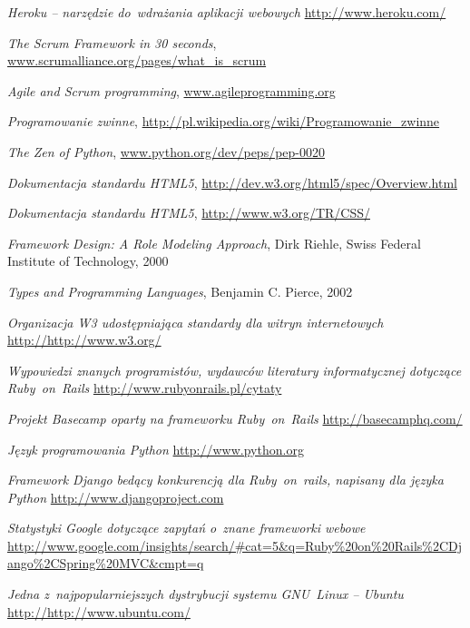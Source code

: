 \begin{thebibliography}{99}
   \emph{Heroku -- narzędzie do~wdrażania aplikacji webowych} \url{http://www.heroku.com/}

   \emph{The Scrum Framework in 30 seconds}, \url{www.scrumalliance.org/pages/what_is_scrum}

   \emph{Agile and Scrum programming}, \url{www.agileprogramming.org}

   \emph{Programowanie zwinne}, \url{http://pl.wikipedia.org/wiki/Programowanie_zwinne}

   \emph{The Zen of Python}, \url{www.python.org/dev/peps/pep-0020}

   \emph{Dokumentacja standardu HTML5}, \url{http://dev.w3.org/html5/spec/Overview.html}

   \emph{Dokumentacja standardu HTML5}, \url{http://www.w3.org/TR/CSS/}

   \emph{Framework Design: A Role Modeling Approach}, Dirk Riehle, Swiss Federal Institute of Technology, 2000

   \emph{Types and Programming Languages}, Benjamin C. Pierce, 2002

   \emph{Organizacja W3 udostępniająca standardy dla witryn internetowych} \url{http://http://www.w3.org/}

   \emph{Wypowiedzi znanych programistów, wydawców literatury informatycznej dotyczące Ruby~on~Rails} \url{http://www.rubyonrails.pl/cytaty}

   \emph{Projekt Basecamp oparty na frameworku Ruby~on~Rails} \url{http://basecamphq.com/}

   \emph{Język programowania Python} \url{http://www.python.org}

   \emph{Framework Django bedący konkurencją dla Ruby~on~rails, napisany dla języka Python} \url{http://www.djangoproject.com}

   \emph{Statystyki Google dotyczące zapytań o~znane frameworki webowe} \url{http://www.google.com/insights/search/\#cat=5\&q=Ruby\%20on\%20Rails\%2CDjango\%2CSpring\%20MVC\&cmpt=q}

   \emph{Jedna z~najpopularniejszych dystrybucji systemu GNU~Linux -- Ubuntu} \url{http://http://www.ubuntu.com/}

\end{thebibliography}

